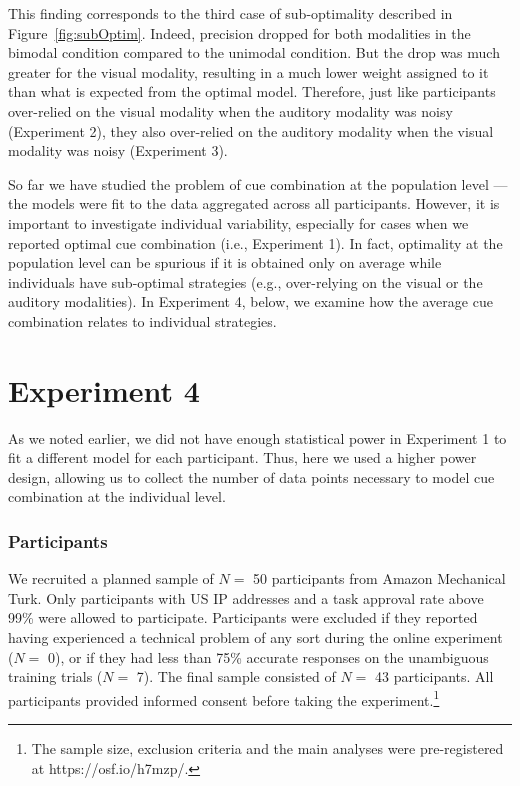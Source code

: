 \documentclass[english,,man,floatsintext]{apa6}
\let\rmarkdownfootnote\footnote%
\def\footnote{\protect\rmarkdownfootnote}
\theoremstyle{definition}
\theoremstyle{definition}
\theoremstyle{definition}
\theoremstyle{remark}
\begin{document}
This finding corresponds to the third case of sub-optimality described
in Figure~\ref{fig:subOptim}. Indeed, precision dropped for both
modalities in the bimodal condition compared to the unimodal condition.
But the drop was much greater for the visual modality, resulting in a
much lower weight assigned to it than what is expected from the optimal
model. Therefore, just like participants over-relied on the visual
modality when the auditory modality was noisy (Experiment 2), they also
over-relied on the auditory modality when the visual modality was noisy
(Experiment 3).

So far we have studied the problem of cue combination at the population
level --- the models were fit to the data aggregated across all
participants. However, it is important to investigate individual
variability, especially for cases when we reported optimal cue
combination (i.e., Experiment 1). In fact, optimality at the population
level can be spurious if it is obtained only on average while
individuals have sub-optimal strategies (e.g., over-relying on the
visual or the auditory modalities). In Experiment 4, below, we examine
how the average cue combination relates to individual strategies.

\section{Experiment 4}\label{experiment-4}

As we noted earlier, we did not have enough statistical power in
Experiment 1 to fit a different model for each participant. Thus, here
we used a higher power design, allowing us to collect the number of data
points necessary to model cue combination at the individual level.

\subsubsection{Participants}\label{participants-3}

We recruited a planned sample of \(N=\) 50 participants from Amazon
Mechanical Turk. Only participants with US IP addresses and a task
approval rate above 99\% were allowed to participate. Participants were
excluded if they reported having experienced a technical problem of any
sort during the online experiment (\(N=\) 0), or if they had less than
75\% accurate responses on the unambiguous training trials (\(N=\) 7).
The final sample consisted of \(N =\) 43 participants. All participants
provided informed consent before taking the
experiment.\footnote{The sample size, exclusion criteria and the main analyses were pre-registered at https://osf.io/h7mzp/.}
\end{document}
